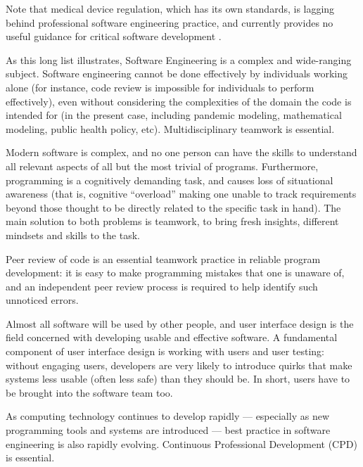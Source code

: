 \documentclass[10pt,a4paper]{article}
\begin{document}
Note that medical device regulation, which has its own standards, is lagging behind professional software engineering practice, and currently provides no useful guidance for critical software development \cite{fixit}.


As this long list illustrates, Software Engineering is a complex and wide-ranging subject. Software engineering cannot be done effectively by individuals working alone (for instance, code review is impossible for individuals to perform effectively), even without considering the complexities of the domain the code is intended for (in the present case, including pandemic modeling, mathematical modeling, public health policy, etc). Multidisciplinary teamwork is essential.

Modern software is complex, and no one person can have the skills to understand all relevant aspects of all but the most trivial of programs. Furthermore, programming is a cognitively demanding task, and causes loss of situational awareness (that is, cognitive ``overload'' making one unable to track requirements beyond those thought to be directly related to the specific task in hand). The main solution to both problems is teamwork, to bring fresh insights, different mindsets and skills to the task.
 
Peer review of code is an essential teamwork practice in reliable program development: \cite{peerReview,knight} it is easy to make programming mistakes that one is unaware of, and an independent peer review process is required to help identify such unnoticed errors. 

Almost all software will be used by other people, and user interface design is the field concerned with developing usable and effective software. A fundamental component of user interface design is working with users and user testing: without engaging users, developers are very likely to introduce quirks that make systems less usable (often less safe) than they should be. In short, users have to be brought into the software team too.


As computing technology continues to develop rapidly --- especially as new programming tools and systems are introduced --- best practice in software engineering is also rapidly evolving. Continuous Professional Development (CPD) is essential. 
\end{document}
